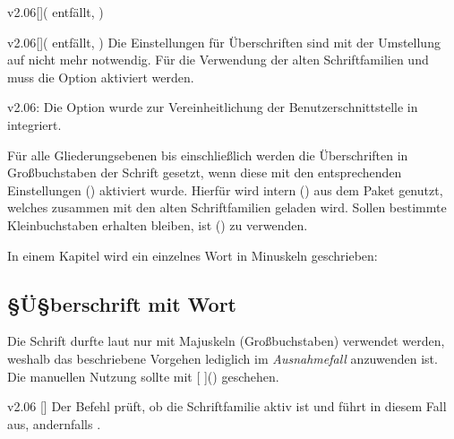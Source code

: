 \begin{Obsolete}{v2.06}[]{}(%
  entfällt, %
)
\begin{Obsolete}{v2.06}[]{}(%
  entfällt, %
)
\printobsoletelist%
%
Die Einstellungen für Überschriften sind mit der Umstellung auf \OpenSans nicht 
mehr notwendig. Für die Verwendung der alten Schriftfamilien \Univers und \DIN 
muss die Option  aktiviert werden.
\end{Obsolete}
\end{Obsolete}

\begin{Obsolete}{v2.06:}{%
}
\printobsoletelist%
%
Die Option  wurde zur Vereinheitlichung der 
Benutzerschnittstelle in  integriert.
\end{Obsolete}


%
Für alle Gliederungsebenen bis einschließlich  werden 
die Überschriften in Großbuchstaben der Schrift \DIN gesetzt, wenn diese mit 
den entsprechenden Einstellungen () aktiviert 
wurde. Hierfür wird intern () aus 
dem Paket  genutzt, welches zusammen mit den alten 
Schriftfamilien geladen wird. Sollen bestimmte Kleinbuchstaben erhalten 
bleiben, ist () zu verwenden.
%
\begin{Example}
In einem Kapitel wird ein einzelnes Wort in Minuskeln geschrieben:
\begin{Code}[escapechar=§]
\chapter{§Ü§berschrift mit  Wort}
\end{Code}
\end{Example}
%
Die Schrift \DIN durfte laut \CD nur mit Majuskeln (Großbuchstaben) verwendet 
werden, weshalb das beschriebene Vorgehen lediglich im \emph{Ausnahmefall} 
anzuwenden ist. Die manuellen Nutzung sollte mit 
[%
]() geschehen.

\begin{Obsolete}{v2.06}{%
  []
}%
\printobsoletelist%
%
Der Befehl  prüft, ob die Schriftfamilie \DIN aktiv ist und führt 
in diesem Fall  aus, andernfalls . 
\end{Obsolete}



